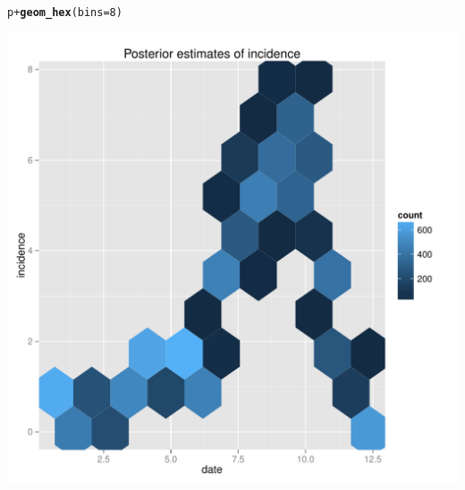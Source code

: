 \documentclass{article}\usepackage[]{graphicx}\usepackage[]{color}
\makeatletter
\newcommand{\hlnum}[1]{\textcolor[rgb]{0.686,0.059,0.569}{#1}}%
\newcommand{\hlopt}[1]{\textcolor[rgb]{0,0,0}{#1}}%
\newcommand{\hlstd}[1]{\textcolor[rgb]{0.345,0.345,0.345}{#1}}%
\newcommand{\hlkwc}[1]{\textcolor[rgb]{0.333,0.667,0.333}{#1}}%
\newcommand{\hlkwd}[1]{\textcolor[rgb]{0.737,0.353,0.396}{\textbf{#1}}}%
\newenvironment{kframe}{%
 \def\at@end@of@kframe{}%
 \ifinner\ifhmode%
  \def\at@end@of@kframe{\end{minipage}}%
  \begin{minipage}{\columnwidth}%
 \fi\fi%
 \def\FrameCommand##1{\hskip\@totalleftmargin \hskip-\fboxsep
 \colorbox{shadecolor}{##1}\hskip-\fboxsep
     \hskip-\linewidth \hskip-\@totalleftmargin \hskip\columnwidth}%
 \MakeFramed {\advance\hsize-\width
   \@totalleftmargin\z@ \linewidth\hsize
   \@setminipage}}%
 {\par\unskip\endMakeFramed%
 \at@end@of@kframe}
\newenvironment{knitrout}{}{} %
\makeatother
\begin{document}
\begin{knitrout}
\color{fgcolor}\begin{kframe}
\begin{alltt}
\hlstd{p} \hlopt{+} \hlkwd{geom_hex}\hlstd{(}\hlkwc{bins}\hlstd{=}\hlnum{8}\hlstd{)}
\end{alltt}
\end{kframe}

{\centering \includegraphics[width=.6\textwidth]{figs/unnamed-chunk-47} 

}



\end{knitrout}
\end{document}

